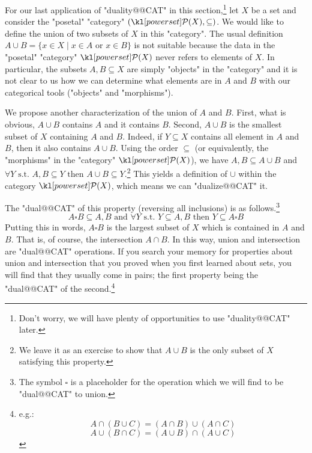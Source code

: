 \documentclass[main.tex]{subfiles}
\begin{document}
\begin{exmp}
For our last application of "duality@@CAT" in this section,\footnote{Don't worry, we will have plenty of opportunities to use "duality@@CAT" later.} let $X$ be a set and consider the "posetal" "category" $(\mP(X), \subseteq)$. We would like to define the union of two subsets of $X$ in this "category". The usual definition $A \cup B = \{x \in X \mid x \in A \text{ or } x \in B\}$ is not suitable because the data in the "posetal" "category" $\mP(X)$ never refers to elements of $X$. In particular, the subsets $A,B \subseteq X$ are simply "objects" in the "category" and it is not clear to us how we can determine what elements are in $A$ and $B$ with our categorical tools ("objects" and "morphisms").

We propose another characterization of the union of $A$ and $B$. First, what is obvious, $A \cup B$ contains $A$ and it contains $B$. Second, $A \cup B$ is the smallest subset of $X$ containing $A$ and $B$. Indeed, if $Y \subseteq X$ contains all element in $A$ and $B$, then it also contains $A \cup B$. Using the order $\subseteq$ (or equivalently, the "morphisms" in the "category" $\mP(X)$), we have $A, B \subseteq A\cup B$ and $\forall Y \text{ s.t. } A, B \subseteq Y \text{ then } A\cup B \subseteq Y$.\footnote{We leave it as an exercise to show that $A \cup B$ is the only subset of $X$ satisfying this property.} This yields a definition of $\cup$ within the category $\mP(X)$, which means we can "dualize@@CAT" it.

The "dual@@CAT" of this property (reversing all inclusions) is as follows.\footnote{The symbol $\square$ is a placeholder for the operation which we will find to be "dual@@CAT" to union.}
\[ A \square B \subseteq A, B \text{ and } \forall Y \text{ s.t. } Y \subseteq A,B \text{ then } Y \subseteq A \square B\]
Putting this in words, $A \square B$ is the largest subset of $X$ which is contained in $A$ and $B$. That is, of course, the intersection $A \cap B$. In this way, union and intersection are "dual@@CAT" operations. If you search your memory for properties about union and intersection that you proved when you first learned about sets, you will find that they usually come in pairs; the first property being the "dual@@CAT" of the second.\footnote{e.g.: \[A \cap (B \cup C) = (A \cap B) \cup (A \cap C)\]\[A \cup (B \cap C) = (A \cup B) \cap (A \cup C)\]}
\end{exmp}
\end{document}
